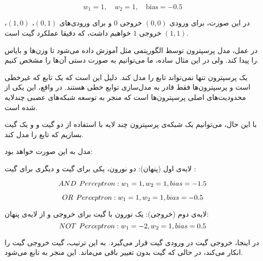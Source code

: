 $$
w_1 = 1, \quad w_2 = 1, \quad \text{bias} = -0.5
$$

در این صورت، برای ورودی $(0, 0)$ خروجی $0$ و برای ورودی‌های $(0, 1)$، $(1, 0)$، $(1, 1)$ خروجی $1$ خواهیم داشت، که دقیقا عملکرد گیت
است.

در عمل، مدل پرسپترون توسط الگوریتمی مثل 
آموزش داده می‌شود تا وزن‌ها و بایاس را پیدا کند. ولی در این مثال ساده، ما می‌توانیم به صورت دستی آن‌ها را مشخص کنیم.



یک پرسپترون تنها نمی‌تواند تابع
را مدل کند. دلیل این است که
یک تابع که غیرخطی است و پرسپترون‌ها فقط قادر به مدل‌سازی توابع خطی هستند. در واقع، این یکی از محدودیت‌های اصلی پرسپترون‌ها است که منجر به توسعه شبکه‌های عصبی چندلایه شده است.

با این حال، می‌توانیم یک شبکه‌ی پرسپترون چند لایه
با استفاده از دو گیت
و
و یک گیت
بسازیم که تابع
را مدل کند.

مدل
به این صورت خواهد بود:

لایه‌ی اول (پنهان): دو نورون، یکی برای گیت
و دیگری برای گیت
:

$$
AND \hspace{1.5mm} Perceptron: w_1 = 1, w_2 = 1, bias = -1.5
$$

$$
OR \hspace{1.5mm} Perceptron: w_1 = 1, w_2 = 1, bias = -0.5
$$

لایه‌ی دوم (خروجی): یک نورون با گیت
برای خروجی
و
از لایه‌ی پنهان:
$$
NOT \hspace{1.5mm} Perceptron: w_1 = -2, w_2 = 1, bias = 0.5
$$

در اینجا، خروجی گیت
در ورودی گیت
قرار می‌گیرد. به این ترتیب، گیت
خروجی گیت
را انکار می‌کند، در حالی که گیت
بدون تغییر باقی می‌ماند. این منجر به تابع
می‌شود.


